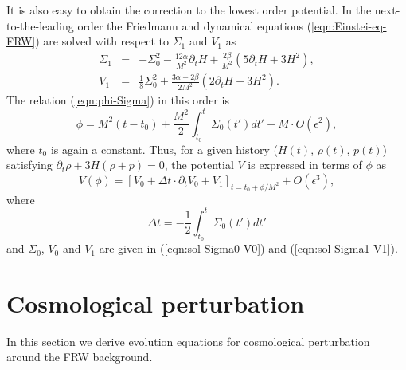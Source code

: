 It is also easy to obtain the correction to the lowest order potential. 
In the next-to-the-leading order the Friedmann and dynamical equations 
(\ref{eqn:Einstei-eq-FRW}) are solved with respect to $\Sigma_1$ and
$V_1$ as 
%
\begin{eqnarray}
 \Sigma_1 & = & -\Sigma_0^2 - \frac{12\alpha}{M^2}\partial_tH
  +\frac{2\beta}{M^2}(5\partial_tH+3H^2), 
  \nonumber\\
 V_1 & = & \frac{1}{8}\Sigma_0^2
  +\frac{3\alpha-2\beta}{2M^2}(2\partial_tH+3H^2). 
  \label{eqn:sol-Sigma1-V1}
\end{eqnarray}
The relation (\ref{eqn:phi-Sigma}) in this order is
%
\begin{equation}
 \phi = M^2 (t-t_0) 
  + \frac{M^2}{2}\int_{t_0}^t \Sigma_0(t')dt'
       + M\cdot O(\epsilon^2), 
\end{equation}
where $t_0$ is again a constant. Thus, for a given history ($H(t)$,
$\rho(t)$, $p(t)$) satisfying $\partial_t\rho+3H(\rho+p)=0$, the
potential $V$ is expressed in terms of $\phi$ as  
%
\begin{equation}
 V(\phi) =
  \left[
   V_0 + \Delta t\cdot\partial_t V_0 + V_1\right]_{t=t_0+\phi/M^2}
  + O(\epsilon^3),
\end{equation}
where 
%
\begin{equation}
 \Delta t =  -\frac{1}{2}\int_{t_0}^t\Sigma_0(t')dt'
\end{equation}
and $\Sigma_0$, $V_0$ and $V_1$ are given in (\ref{eqn:sol-Sigma0-V0})
and (\ref{eqn:sol-Sigma1-V1}). 



\section{Cosmological perturbation}
\label{sec:perturbation}

In this section we derive evolution equations for cosmological
perturbation around the FRW background. 


